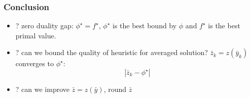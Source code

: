\begin{frame}
  \frametitle{Conclusion}

  \begin{itemize}
    \item ? zero duality gap: \(\phi^\star = f^\star\), \(\phi^\star\) is the best bound by \(\phi\) and \( f^\star\) is the best primal value.
    \item ? can we bound the quality of heuristic for averaged solution? \(\bar z_k = z(\bar y_k)\) converges to \(\phi^\star\):
          \[|\bar z_k - \phi^\star| \]
    \item ? can we improve \(\bar z = z(\bar y)\), round \(\bar z\)
  \end{itemize}
\end{frame}


